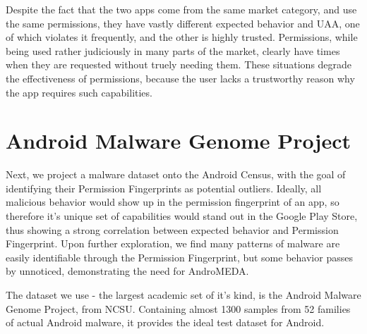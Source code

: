 Despite the fact that the two apps come from the same market category, and use the same permissions, they have vastly different expected behavior and UAA, one of which violates it frequently, and the other is highly trusted. Permissions, while being used rather judiciously in many parts of the market, clearly have times when they are requested without truely needing them. These situations degrade the effectiveness of permissions, because the user lacks a trustworthy reason why the app requires such capabilities.







\section{Android Malware Genome Project}
Next, we project a malware dataset onto the Android Census, with the goal of identifying their Permission Fingerprints as potential outliers. Ideally, all malicious behavior would show up in the permission fingerprint of an app, so therefore it's unique set of capabilities would stand out in the Google Play Store, thus showing a strong correlation between expected behavior and Permission Fingerprint. Upon further exploration, we find many patterns of malware are easily identifiable through the Permission Fingerprint, but some behavior passes by unnoticed, demonstrating the need for AndroMEDA.

The dataset we use - the largest academic set of it's kind, is the Android Malware Genome Project\citep{zhou2012dissecting}, from NCSU. Containing almost 1300 samples from 52 families of actual Android malware, it provides the ideal test dataset for Android. 

